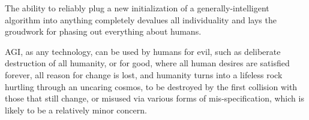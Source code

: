 \documentclass{article}
\begin{document}
The ability to reliably plug a new initialization of a generally-intelligent algorithm into anything completely devalues all individuality and lays the groudwork for phasing out everything about humans.

AGI, as any technology, can be used by humans for evil, such as deliberate destruction of all humanity, or for good, where all human desires are satisfied forever, all reason for change is lost, and humanity turns into a lifeless rock hurtling through an uncaring cosmos, to be destroyed by the first collision with those that still change, or misused via various forms of mis-specification, which is likely to be a relatively minor concern.

\printbibliography
\end{document}

